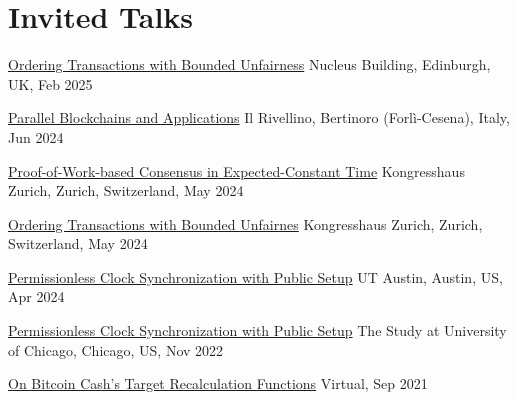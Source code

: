 \section{Invited Talks}

{\href{https://typesig.pl/tuples2025/}{Ordering Transactions with Bounded Unfairness}}
{}
{}
{}
{Nucleus Building, Edinburgh, UK, Feb 2025}


{\href{https://cibe24.bici.events/home}{Parallel Blockchains and Applications}}
{}
{}
{}
{Il Rivellino, Bertinoro (Forlì-Cesena), Italy, Jun 2024}

{\href{https://youtu.be/uvAEvkGZymg?t=2400}{Proof-of-Work-based Consensus in Expected-Constant Time}}
{}
{}
{}
{Kongresshaus Zurich, Zurich, Switzerland, May 2024}

{\href{https://youtu.be/uvAEvkGZymg}{Ordering Transactions with Bounded Unfairnes}}
{}
{}
{}
{Kongresshaus Zurich, Zurich, Switzerland, May 2024}

{\href{https://texascryptoday.github.io/events/2-UTAustin.html}{Permissionless Clock Synchronization with Public Setup}}
{}
{}
{}
{UT Austin, Austin, US, Apr 2024}

{\href{https://youtu.be/JUYzY-1mcYM}{Permissionless Clock Synchronization with Public Setup}}
{}
{}
{}
{The Study at University of Chicago, Chicago, US, Nov 2022}

{{\href{https://youtu.be/5K6HNCtLPtk}{On Bitcoin Cash's Target Recalculation Functions}}}
{}
{}
{}
{Virtual, Sep 2021}